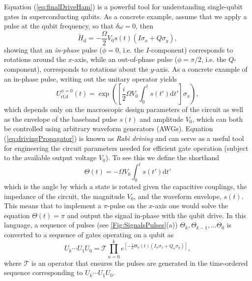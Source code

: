 \documentclass[aip,apr,twocolumn,showpacs,superscriptaddress,groupedaddress,nofootinbib,reprint]{revtex4-1}  %
\newcommand{\omegad}{\delta\omega}
\renewcommand{\d}{\text{d}}
\begin{document}
Equation (\ref{eq:finalDriveHam}) is a powerful tool for understanding single-qubit gates in superconducting qubits. As a concrete example, assume that we apply a pulse at the qubit frequency, so that $\omegad = 0$, then
\begin{equation}
\widetilde H_\text{d} = -\frac{\Omega}{2}V_0s(t)\left(I\sigma_x +Q\sigma_y \right),
\end{equation}
showing that an \emph{in-phase} pulse ($\phi =0$, i.e. the $I$-component) corresponds to rotations around the $x$-axis, while an out-of-phase pulse ($\phi=\pi/2$, i.e. the $Q$-component), corresponds to rotations about the $y$-axis. As a concrete example of an in-phase pulse, writing out the unitary operator yields
\begin{equation}
U^{\phi = 0}_\text{rf,d}(t) = \exp\left( \left[\frac{i}{2}\Omega  V_0 \int_0^{t} s(t')\d t'  \right]\sigma_x \right), \label{eq:drivingPropagator}
\end{equation}
which depends only on the macroscopic design parameters of the circuit as well as the envelope of the baseband pulse $s(t)$ and amplitude $V_0$, which can both be controlled using arbitrary waveform generators (AWGs). Equation (\ref{eq:drivingPropagator}) is known as \emph{Rabi driving} and can serve as a useful tool for engineering the circuit parameters needed for efficient gate operation (subject to the available output voltage $V_0$). To see this we define the shorthand
\begin{equation}
\Theta(t) = -\Omega V_0\int_0^{t} s(t')\d t'
\end{equation}
which is the angle by which a state is rotated given the capacitive couplings, the impedance of the circuit, the magnitude $V_0$, and the waveform envelope, $s(t)$. This means that to implement a $\pi$-pulse on the $x$-axis one would solve the equation $\Theta(t) = \pi$ and output the signal in-phase with the qubit drive. In this language, a sequence of pulses (see \cref{Fig:SignalsPulses}(a)) $\Theta_k, \Theta_{k-1},...\Theta_0$ is converted to a sequence of gates operating on a qubit as
\begin{equation}
U_k\cdots U_1U_0 = \mathcal T\prod_{n=0}^k  e^{\left[-\frac{i}{2} \Theta_n(t)\left(I_n \sigma_x + Q_n \sigma_y\right)\right]}, \label{eq:sequencesandwaveforms}
\end{equation}
where $\mathcal T$ is an operator that ensures the pulses are generated in the time-ordered sequence corresponding to $U_k\cdots U_1U_0$.
\end{document}
